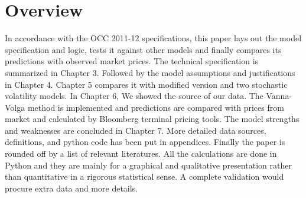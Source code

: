\chapter{Overview}
In accordance with the OCC 2011-12 specifications, this paper lays out the model specification and logic, tests it against other models and finally compares its predictions with observed market prices. 
\newline
\newline
The technical specification is summarized in Chapter 3. Followed by the model assumptions and justifications in Chapter 4. Chapter 5 compares it with modified version and two stochastic volatility models. In Chapter 6, We showed the source of our data. The Vanna-Volga method is implemented and predictions are compared with prices from market and calculated by Bloomberg terminal pricing tools.
The model strengths and weaknesses are concluded in Chapter 7. More detailed data sources, definitions, and python code has been put in appendices. Finally the paper is rounded off by a list of relevant literatures. \newline
\newline
All the calculations are done in Python and they are mainly for a graphical and qualitative presentation rather than quantitative in a rigorous statistical sense. A complete validation would procure extra data and more details.